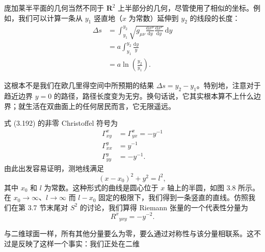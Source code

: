 庞加莱半平面的几何当然不同于 $\mathbf{R}^2$ 上半部分的几何，尽管使用了相似的坐标。例如，我们可以计算一条从 $y_1$ 竖直地（$x$ 为常数）延伸到 $y_2$ 的线段的长度：
\begin{align*}
\Delta s &= \int_{y_1}^{y_2}\sqrt{g_{\mu\nu}\frac{\mathrm{d}x^\mu}{\mathrm{d}y}\frac{\mathrm{d}x^\nu}{\mathrm{d}y}}\,\mathrm{d}y\\
&= a\int_{y_1}^{y_2}\frac{\mathrm{d}y}{y}\\
&= a\ln\left(\frac{y_2}{y_1}\right).
\tag{3.193}
\end{align*}

这根本不是我们在欧几里得空间中所预期的结果 $\Delta s = y_2 - y_1$。特别地，注意对于趋近边界 $y = 0$ 的路径，路径长度变为无穷。换句话说，它其实根本算不上什么边界；就生活在双曲面上的任何居民而言，它无限遥远。

式 (3.192) 的非零 Christoffel 符号为
\begin{align*}
\Gamma^x_{xy} &= \Gamma^x_{yx} = -y^{-1}\\
\Gamma^y_{xx} &= y^{-1}\\
\Gamma^y_{yy} &= -y^{-1}.
\tag{3.194}
\end{align*}
由此出发容易证明，测地线满足
\begin{equation*}
(x - x_0)^2 + y^2 = l^2,
\tag{3.195}
\end{equation*}
其中 $x_0$ 和 $l$ 为常数。这种形式的曲线是圆心位于 $x$ 轴上的半圆，如图 3.8 所示。在 $x_0 \to \infty$、$l \to \infty$ 而 $l - x_0$ 固定的极限下，我们得到一条竖直的直线。仿照我们在第 3.7 节末尾对 $S^2$ 的讨论，我们算得 Riemann 张量的一个代表性分量为
\begin{equation*}
R^x{}_{yxy} = -y^{-2}.
\tag{3.196}
\end{equation*}

与二维球面一样，所有其他分量要么为零，要么通过对称性与该分量相联系。这不过是反映了这样一个事实：我们正处在二维
